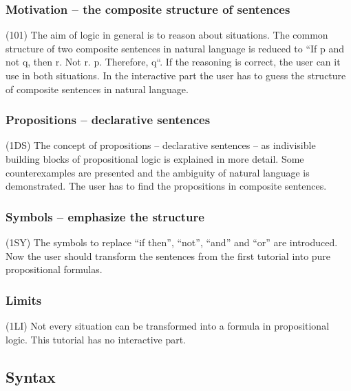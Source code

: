 \begin{verbatim}
\end{verbatim}

\subsubsection{Motivation – the composite structure of sentences}
\label{tut:101}

(101) The aim of logic in general is to reason about situations.\cite{Huth:2004:LCS:975331} 
The common structure of two composite sentences in natural language 
is reduced to “If p and not q, then r. Not r. p. Therefore, q“. 
If the reasoning is correct, the user can it use in both situations.
In the interactive part the user has to guess the structure of composite sentences in natural language. 

\subsubsection{Propositions – declarative sentences}
\label{tut:1DC}

(1DS) The concept of propositions – declarative sentences – 
as indivisible building blocks of propositional logic 
is explained in more detail. Some counterexamples are presented 
and the ambiguity of natural language is demonstrated.
The user has to find the propositions in composite sentences. 

\subsubsection{Symbols – emphasize the structure}
\label{tut:1SY}

(1SY) The symbols to replace “if then”, “not”, “and” and “or” are introduced. 
Now the user should transform the sentences from the first tutorial into pure propositional formulas. 

\subsubsection{Limits}
\label{tut:1LI}

(1LI) Not every situation can be transformed into a formula in propositional logic. 
This tutorial has no interactive part.

\subsection{Syntax}

